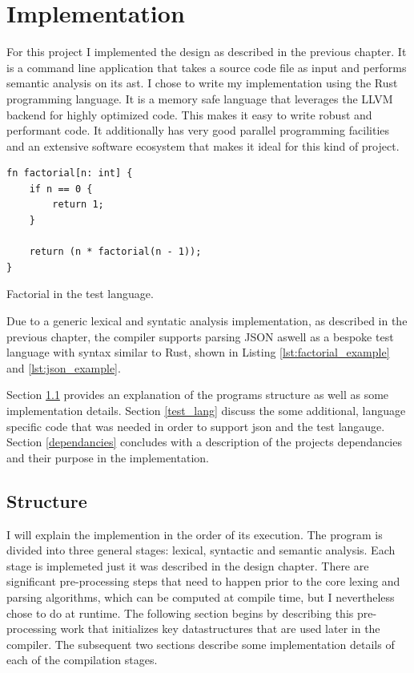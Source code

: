 \chapter{Implementation} \label{implementation}

For this project I implemented the design as described in the previous chapter.
It is a command line application that takes a source code file as input and
performs semantic analysis on its \gls{ast}. I chose to write my implementation
using the Rust programming language. It is a memory safe language that leverages
the LLVM backend for highly optimized code. This makes it easy to write
robust and performant code. It additionally has very good parallel programming
facilities and an extensive software ecosystem that makes it ideal for this kind
of project. 

\begin{listing}[t]
\begin{verbatim}
fn factorial[n: int] {
    if n == 0 {
        return 1;
    } 

    return (n * factorial(n - 1));
}
\end{verbatim}
\caption{Factorial in the test language.}
\label{lst:factorial_example}
\end{listing}

Due to a generic lexical and syntatic analysis implementation, as described in the previous chapter,
the compiler supports parsing JSON aswell as a bespoke test language with syntax similar to Rust,
shown in Listing \ref{lst:factorial_example} and \ref{lst:json_example}.

Section \ref{structure} provides an explanation of the programs structure as well as some
implementation details.
\newline \newline
Section \ref{test_lang} discuss the some additional, language specific code that was needed in order
to support \gls{json} and the test langauge.
\newline \newline
Section \ref{dependancies} concludes with a description of the projects dependancies and their
purpose in the implementation.

\section{Structure} \label{structure}

I will explain the implemention in the order of its execution. The program is divided into three
general stages: lexical, syntactic and semantic analysis. Each stage is implemeted just it was
described in the design chapter. There are significant pre-processing steps that need to happen
prior to the core lexing and parsing algorithms, which can be computed at compile time, but I
nevertheless chose to do at runtime. The following section begins by describing this pre-processing
work that initializes key datastructures that are used later in the compiler. The subsequent two
sections describe some implementation details of each of the compilation stages.

